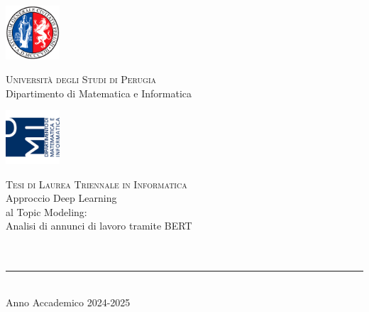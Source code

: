 \thispagestyle{empty}

\noindent
\includegraphics[width=0.15\textwidth]{img/logoUniPg}
\begin{minipage}[b]{0.7\textwidth}
    \centering
    {\Large \textsc{Universit\`a degli Studi di Perugia}}\\[0.4em]
    {\large Dipartimento di Matematica e Informatica}
\end{minipage}%
\includegraphics[width=0.15\textwidth]{img/logoDMI}

\vspace{5em}

\begin{center}
    {\large \textsc{Tesi di Laurea Triennale in Informatica}}\\[5em]
    {\Huge Approccio Deep Learning \\[0.75em] al Topic Modeling:}\\[1.5em]
    {\LARGE Analisi di annunci di lavoro tramite BERT}
    \\[8.4em]
    \\[1em]
    \\[3em]
    \vfill
    {\rule{380pt}{0.4pt}}\\[1.1em]
    {Anno Accademico 2024-2025}
\end{center}

